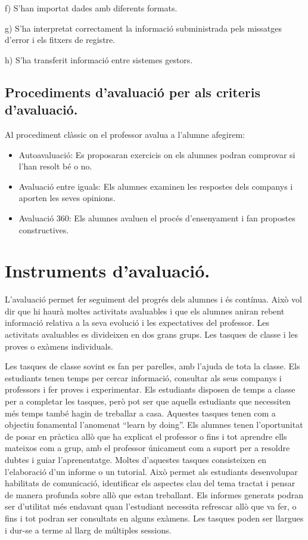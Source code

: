 \documentclass[catalan, a4paper, 12pt, titlepage]{article}
\begin{document}
f) S'han importat dades amb diferents formats.

g) S'ha interpretat correctament la informació subministrada pels missatges d'error i els fitxers de registre.

h) S'ha transferit informació entre sistemes gestors.

\subsection{Procediments d'avaluació per als criteris d'avaluació.}
\label{subsec:procediments}

Al procediment clàssic on el professor avalua a l'alumne afegirem:

\begin{itemize}
	\item Autoavaluació: Es proposaran exercicis on els alumnes podran comprovar si l'han resolt bé o no.
	\item Avaluació entre iguals: Els alumnes examinen les respostes dels companys i aporten les seves opinions.
	\item Avaluació 360: Els alumnes avaluen el procés d'ensenyament i fan propostes constructives.
\end{itemize}

\section{Instruments d'avaluació.}
\label{sec:instruments}

L'avaluació permet fer seguiment del progrés dels alumnes i és contínua.
Això vol dir que hi haurà moltes activitats avaluables i que els alumnes aniran rebent informació relativa a la seva evolució i les expectatives del professor.
Les activitats avaluables es divideixen en dos grans grups. 
Les tasques de classe i les proves o exàmens individuals.

Les tasques de classe sovint es fan per parelles, amb l'ajuda de tota la classe.
Els estudiants tenen temps per cercar informació, consultar als seus companys i professors i fer proves i experimentar. 
Els estudiants disposen de temps a classe per a completar les tasques, però pot ser que aquells estudiants que necessiten més temps també hagin de treballar a casa.
Aquestes tasques tenen com a objectiu fonamental l'anomenat ``learn by doing''.
Els alumnes tenen l'oportunitat de posar en pràctica allò que ha explicat el professor o fins i tot aprendre ells mateixos com a grup, amb el professor únicament com a suport per a resoldre dubtes i guiar l'aprenentatge.
Moltes d'aquestes tasques consisteixen en l'elaboració d'un informe o un tutorial.
Això permet als estudiants desenvolupar habilitats de comunicació, identificar els aspectes clau del tema tractat i pensar de manera profunda sobre allò que estan treballant. Els informes generats podran ser d'utilitat més endavant quan l'estudiant necessita refrescar allò que va fer, o fins i tot podran ser consultats en alguns exàmens.
Les tasques poden ser llargues i dur-se a terme al llarg de múltiples sessions.
\end{document}
